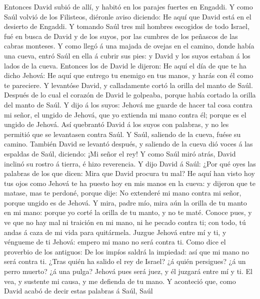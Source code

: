  Entonces David subió de allí, y habitó en los parajes
fuertes en Engaddi.  Y como Saúl volvió de los Filisteos,
diéronle aviso diciendo: He aquí que David está en el desierto de
Engaddi.  Y tomando Saúl tres mil hombres escogidos de
todo Israel, fué en busca de David y de los suyos, por las cumbres de
los peñascos de las cabras monteses.  Y como llegó á una
majada de ovejas en el camino, donde había una cueva, entró Saúl en ella
á cubrir sus pies: y David y los suyos estaban á los lados de la cueva.
 Entonces los de David le dijeron: He aquí el día de que
te ha dicho Jehová: He aquí que entrego tu enemigo en tus manos, y harás
con él como te pareciere. Y levantóse David, y calladamente cortó la
orilla del manto de Saúl.  Después de lo cual el corazón
de David le golpeaba, porque había cortado la orilla del manto de Saúl.
 Y dijo á los suyos: Jehová me guarde de hacer tal cosa
contra mi señor, el ungido de Jehová, que yo extienda mi mano contra él;
porque es el ungido de Jehová.  Así quebrantó David á los
suyos con palabras, y no les permitió que se levantasen contra Saúl. Y
Saúl, saliendo de la cueva, fuése su camino.  También
David se levantó después, y saliendo de la cueva dió voces á las
espaldas de Saúl, diciendo: ¡Mi señor el rey! Y como Saúl miró atrás,
David inclinó su rostro á tierra, é hizo reverencia.  Y
dijo David á Saúl: ¿Por qué oyes las palabras de los que dicen: Mira que
David procura tu mal?  He aquí han visto hoy tus ojos
como Jehová te ha puesto hoy en mis manos en la cueva: y dijeron que te
matase, mas te perdoné, porque dije: No extenderé mi mano contra mi
señor, porque ungido es de Jehová.  Y mira, padre mío,
mira aún la orilla de tu manto en mi mano: porque yo corté la orilla de
tu manto, y no te maté. Conoce pues, y ve que no hay mal ni traición en
mi mano, ni he pecado contra ti; con todo, tú andas á caza de mi vida
para quitármela.  Juzgue Jehová entre mí y ti, y véngueme
de ti Jehová: empero mi mano no será contra ti.  Como
dice el proverbio de los antiguos: De los impíos saldrá la impiedad: así
que mi mano no será contra ti.  ¿Tras quién ha salido el
rey de Israel? ¿á quién persigues? ¿á un perro muerto? ¿á una pulga?
 Jehová pues será juez, y él juzgará entre mí y ti. El
vea, y sustente mi causa, y me defienda de tu mano.  Y
aconteció que, como David acabó de decir estas palabras á Saúl, Saúl
